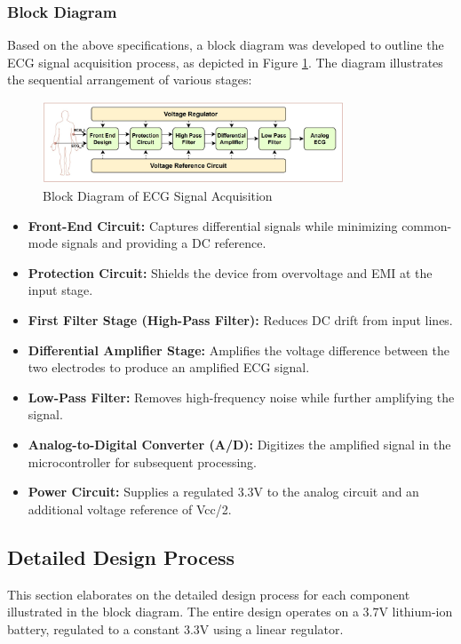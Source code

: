 \subsubsection{Block Diagram}
\vspace{1em}
Based on the above specifications, a block diagram was developed to outline the ECG signal acquisition process, as depicted in Figure \ref{fig:ecg_block_diagram}. The diagram illustrates the sequential arrangement of various stages:

\begin{figure}[H]
	\centering
	\includegraphics[width=0.8\textwidth]{images/block_diagram_ecg}
	\caption{Block Diagram of ECG Signal Acquisition}
	\label{fig:ecg_block_diagram}
\end{figure}

\begin{itemize}
	\item \textbf{Front-End Circuit:} Captures differential signals while minimizing common-mode signals and providing a DC reference.
	\item \textbf{Protection Circuit:} Shields the device from overvoltage and EMI at the input stage.
	\item \textbf{First Filter Stage (High-Pass Filter):} Reduces DC drift from input lines.
	\item \textbf{Differential Amplifier Stage:} Amplifies the voltage difference between the two electrodes to produce an amplified ECG signal.
	\item \textbf{Low-Pass Filter:} Removes high-frequency noise while further amplifying the signal.
	\item \textbf{Analog-to-Digital Converter (A/D):} Digitizes the amplified signal in the microcontroller for subsequent processing.
	\item \textbf{Power Circuit:} Supplies a regulated 3.3V to the analog circuit and an additional voltage reference of Vcc/2.
\end{itemize}



\subsection{Detailed Design Process}
\vspace{1em}
This section elaborates on the detailed design process for each component illustrated in the block diagram. The entire design operates on a 3.7V lithium-ion battery, regulated to a constant 3.3V using a linear regulator.

